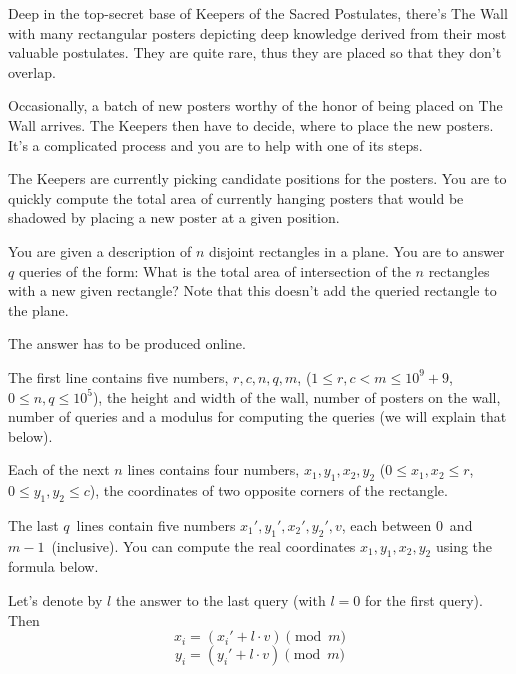 





Deep in the top-secret base of Keepers of the Sacred Postulates, there's The
Wall with many rectangular posters depicting deep knowledge derived from their
most valuable postulates. They are quite rare, thus they are placed so that they don't overlap.

Occasionally, a batch of new posters worthy of the honor of
being placed on The Wall arrives. The Keepers then have to decide, where to place
the new posters. It's a complicated process and you are to help with one of its steps.

The Keepers are currently picking candidate positions for the posters. You are
to quickly compute the total area of currently hanging posters that would
be shadowed by placing a new poster at a given position.


You are given a description of $n$ disjoint rectangles in a plane. You are to answer
$q$ queries of the form: What is the total area of intersection of the $n$ rectangles
with a new given rectangle? Note that this doesn't add the queried rectangle to the plane.

The answer has to be produced online.


The first line contains five numbers, $r, c, n, q, m$, ($1 \leq r, c < m \leq 10^9 + 9$, $0 \leq n,q \leq 10^5$),
the height and width of the wall, number of posters on the wall, number of
queries and a modulus for computing the queries (we will explain that below).

Each of the next $n$ lines contains four numbers, $x_1, y_1, x_2, y_2$ ($0 \leq x_1, x_2 \leq r$,
$0 \leq y_1, y_2 \leq c$), the coordinates of two opposite corners of the rectangle.

The last $q$ lines contain five numbers $x_1', y_1', x_2', y_2', v$, each between
$0$ and $m - 1$ (inclusive). You can compute the real coordinates $x_1, y_1, x_2, y_2$
using the formula below.

Let's denote by $l$ the answer to the last query (with $l=0$ for the first query). Then 
$$x_i = (x_i' + l \cdot v) \pmod m$$
$$y_i = (y_i' + l \cdot v) \pmod m$$

